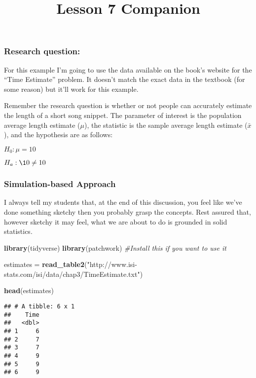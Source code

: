 \documentclass[
]{article}
\title{Lesson 7 Companion}
\author{}
\date{\vspace{-2.5em}}
\newenvironment{Shaded}{\begin{snugshade}}{\end{snugshade}}
\newcommand{\CommentTok}[1]{\textcolor[rgb]{0.56,0.35,0.01}{\textit{#1}}}
\newcommand{\KeywordTok}[1]{\textcolor[rgb]{0.13,0.29,0.53}{\textbf{#1}}}
\newcommand{\NormalTok}[1]{#1}
\newcommand{\StringTok}[1]{\textcolor[rgb]{0.31,0.60,0.02}{#1}}
\begin{document}
\maketitle

\hypertarget{research-question}{%
\subsubsection{Research question:}\label{research-question}}

For this example I'm going to use the data available on the book's
website for the ``Time Estimate'' problem. It doesn't match the exact
data in the textbook (for some reason) but it'll work for this example.

Remember the research question is whether or not people can accurately
estimate the length of a short song snippet. The parameter of interest
is the population average length estimate (\(\mu\)), the statistic is
the sample average length estimate (\(\bar{x}\)), and the hypothesis are
as follows:

\(H_{0}: \mu = 10\)

\(H_{a}: \10 \neq 10\)

\hypertarget{simulation-based-approach}{%
\subsubsection{Simulation-based
Approach}\label{simulation-based-approach}}

I always tell my students that, at the end of this discussion, you feel
like we've done something sketchy then you probably grasp the concepts.
Rest assured that, however sketchy it may feel, what we are about to do
is grounded in solid statistics.

\begin{Shaded}
\begin{Highlighting}[]
\KeywordTok{library}\NormalTok{(tidyverse)}
\KeywordTok{library}\NormalTok{(patchwork) }\CommentTok{#Install this if you want to use it}

\NormalTok{estimates =}\StringTok{ }\KeywordTok{read_table2}\NormalTok{(}\StringTok{"http://www.isi-stats.com/isi/data/chap3/TimeEstimate.txt"}\NormalTok{)}

\KeywordTok{head}\NormalTok{(estimates)}
\end{Highlighting}
\end{Shaded}

\begin{verbatim}
## # A tibble: 6 x 1
##    Time
##   <dbl>
## 1     6
## 2     7
## 3     7
## 4     9
## 5     9
## 6     9
\end{verbatim}
\end{document}
